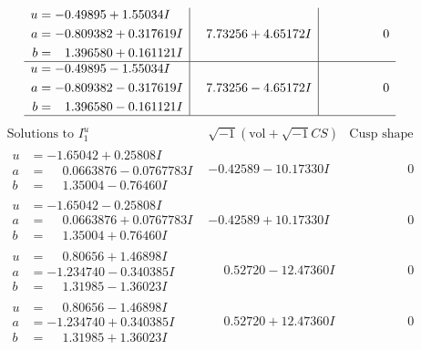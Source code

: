 \documentclass[1p]{elsarticle_modified}
\theoremstyle{definition}
\newcommand{\I}{\sqrt{-1}}
\begin{document}
$$\begin{array}{c|c|c}
\begin{aligned}
u &= -0.49895 + 1.55034 I \\
a &= -0.809382 + 0.317619 I \\
b &= \phantom{-}1.396580 + 0.161121 I\end{aligned}
 & \phantom{-}7.73256 + 4.65172 I & \phantom{-0.000000 } 0 \\ \hline\begin{aligned}
u &= -0.49895 - 1.55034 I \\
a &= -0.809382 - 0.317619 I \\
b &= \phantom{-}1.396580 - 0.161121 I\end{aligned}
 & \phantom{-}7.73256 - 4.65172 I & \phantom{-0.000000 } 0\\
 \hline 
 \end{array}$$\newpage$$\begin{array}{c|c|c}  
\text{Solutions to }I^u_{1}& \I (\text{vol} + \sqrt{-1}CS) & \text{Cusp shape}\\
 \hline 
\begin{aligned}
u &= -1.65042 + 0.25808 I \\
a &= \phantom{-}0.0663876 - 0.0767783 I \\
b &= \phantom{-}1.35004 - 0.76460 I\end{aligned}
 & -0.42589 - 10.17330 I & \phantom{-0.000000 } 0 \\ \hline\begin{aligned}
u &= -1.65042 - 0.25808 I \\
a &= \phantom{-}0.0663876 + 0.0767783 I \\
b &= \phantom{-}1.35004 + 0.76460 I\end{aligned}
 & -0.42589 + 10.17330 I & \phantom{-0.000000 } 0 \\ \hline\begin{aligned}
u &= \phantom{-}0.80656 + 1.46898 I \\
a &= -1.234740 - 0.340385 I \\
b &= \phantom{-}1.31985 - 1.36023 I\end{aligned}
 & \phantom{-}0.52720 - 12.47360 I & \phantom{-0.000000 } 0 \\ \hline\begin{aligned}
u &= \phantom{-}0.80656 - 1.46898 I \\
a &= -1.234740 + 0.340385 I \\
b &= \phantom{-}1.31985 + 1.36023 I\end{aligned}
 & \phantom{-}0.52720 + 12.47360 I & \phantom{-0.000000 } 0 \\ \hline\begin{aligned}

\end{aligned}
\end{array}$$
\end{document}
